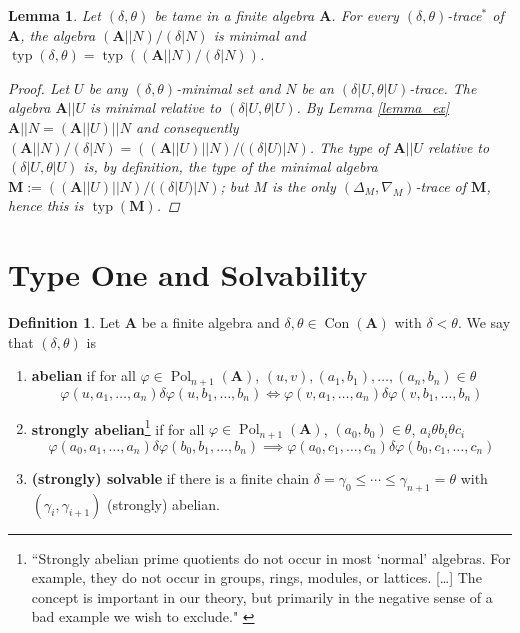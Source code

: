 \documentclass{amsart}
\theoremstyle{plain}
\newtheorem{lemma}[theorem]{Lemma}
\theoremstyle{definition}
\newtheorem{definition}[theorem]{Definition}
\theoremstyle{remark}
\def\phi{\varphi}
\DeclareMathOperator{\Con}{Con}
\DeclareMathOperator{\Pol}{Pol}
\DeclareMathOperator{\typ}{typ}
\begin{document}
\begin{lemma}
    Let $(\delta, \theta)$ be tame in a finite algebra $\mathbf{A}$.
    For every $(\delta, \theta)$-trace$^*$ of $\mathbf{A}$, the algebra $(\mathbf{A}||N)/(\delta|N)$ is minimal and $\typ(\delta, \theta) = \typ((\mathbf{A}||N)/(\delta|N))$. 
    \begin{proof}
        Let $U$ be any $(\delta, \theta)$-minimal set and $N$ be an $(\delta|U, \theta|U)$-trace. 
        The algebra $\mathbf{A}||U$ is minimal relative to $(\delta|U, \theta|U)$. 
        By Lemma \ref{lemma_ex} $\mathbf{A}||N = (\mathbf{A}||U)||N$ and consequently $(\mathbf{A}||N)/(\delta|N) = ((\mathbf{A}||U)||N)/((\delta|U)|N)$. 
        The type of $\mathbf{A}||U$ relative to $(\delta|U, \theta|U)$ is, by definition, the type of the minimal algebra $\mathbf{M}:= ((\mathbf{A}||U)||N)/((\delta|U)|N)$; 
        but $M$ is the only $(\Delta_M, \nabla_M)$-trace of $\mathbf{M}$, hence this is $\typ(\mathbf{M})$.
    \end{proof}
\end{lemma}

\section{Type One and Solvability}

\begin{definition}
    Let $\mathbf{A}$ be a finite algebra and $\delta, \theta \in \Con(\mathbf{A})$ with $\delta < \theta$. 
    We say that $(\delta, \theta)$ is 
    \begin{enumerate}
        \item \textbf{abelian} if for all $\phi \in \Pol_{n+1}(\mathbf{A})$, $(u,v), (a_1, b_1), \ldots, (a_n,b_n) \in \theta$ 
        \begin{equation*}
            \phi(u, a_1, \ldots, a_n) \delta \phi(u, b_1, \ldots, b_n) \iff \phi(v, a_1, \ldots, a_n) \delta \phi(v, b_1, \ldots, b_n)
        \end{equation*}
        \item \textbf{strongly abelian}\footnote{``Strongly abelian prime quotients do not occur 
        in most `normal' algebras. For example, they do not occur in groups, rings, modules, or lattices. 
        [\ldots] The concept is important in our theory, but primarily in the negative sense of a bad example we wish to exclude." \cite[p. 44]{finite}
        } 
        if for all $\phi \in \Pol_{n+1}(\mathbf{A})$, $(a_0,b_0) \in \theta$, $a_i \theta b_i \theta c_i$ 
        \begin{equation*}
            \phi(a_0, a_1, \ldots, a_n) \delta \phi(b_0, b_1, \ldots, b_n) \implies \phi(a_0, c_1, \ldots, c_n) \delta \phi(b_0, c_1, \ldots, c_n)
        \end{equation*}
        \item \textbf{(strongly) solvable} if there is a finite chain $\delta=\gamma_0 \le \cdots \le \gamma_{n+1}=\theta$ with $(\gamma_i, \gamma_{i+1})$ (strongly) abelian.  
    \end{enumerate}
\end{definition}
\end{document}
